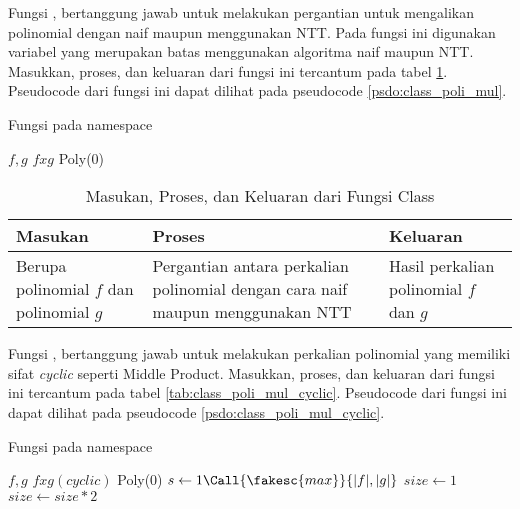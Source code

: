 \newpage

Fungsi , bertanggung jawab untuk melakukan pergantian untuk mengalikan polinomial dengan naif maupun menggunakan NTT. Pada fungsi ini digunakan variabel  yang merupakan batas menggunakan algoritma naif maupun NTT. Masukkan, proses, dan keluaran dari fungsi ini tercantum pada tabel \ref{tab:class_poli_mul}. Pseudocode dari fungsi ini dapat dilihat pada pseudocode \ref{psdo:class_poli_mul}.

\begin{algorithm}
	\caption{Fungsi  pada namespace }
	\label{psdo:class_poli_mul}
	\begin{algorithmic}[1]
		\Require $ f, g $
		\Ensure $ f x g $
			\State \Return Poly(0)
		\EndIf
			\State \Return {}
		\EndIf
		\State {}
		\State \Return {}
	\end{algorithmic}
\end{algorithm}

\begin{table}[]	
	\Centering
	\begin{tabular}{|p{3cm}|p{3cm}|p{3cm}|}
	\hline
	Masukan & Proses & Keluaran \\ \hline
	Berupa polinomial $f$ dan polinomial $g$ & Pergantian antara perkalian polinomial dengan cara naif maupun menggunakan NTT & Hasil perkalian polinomial $f$ dan $g$\\ \hline
	\end{tabular}
	\caption{Masukan, Proses, dan Keluaran dari Fungsi  Class }
	\label{tab:class_poli_mul}
\end{table}

\newpage

Fungsi , bertanggung jawab untuk melakukan perkalian polinomial yang memiliki sifat \textit{cyclic} seperti Middle Product. Masukkan, proses, dan keluaran dari fungsi ini tercantum pada tabel \ref{tab:class_poli_mul_cyclic}. Pseudocode dari fungsi ini dapat dilihat pada pseudocode \ref{psdo:class_poli_mul_cyclic}.

\begin{algorithm}
	\caption{Fungsi  pada namespace }
	\label{psdo:class_poli_mul_cyclic}
	\begin{algorithmic}[1]
		\Require $ f, g $
		\Ensure $ f x g (\textit{cyclic})$
			\State \Return Poly(0)
		\EndIf
		\State {}
		\State $ s \leftarrow 1 \Call{\fakesc{max}}{|f|,|g|} $
		\State $ size \leftarrow 1 $
		  $size \leftarrow size * 2$ \EndWhile
			\State \Return {}
		\EndIf
		\State \Return {}
	\end{algorithmic}
\end{algorithm}

